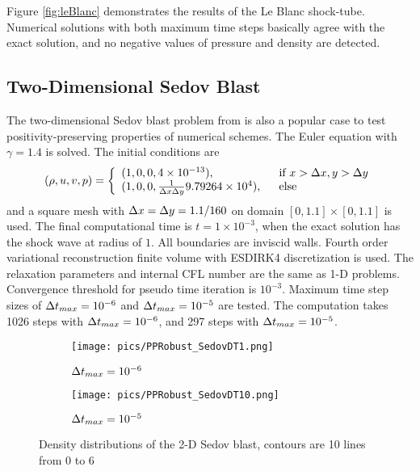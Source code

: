 Figure \ref{fig:leBlanc} demonstrates 
the results of the Le Blanc shock-tube.
Numerical solutions with both maximum time steps 
basically agree with the exact solution, 
and no negative values of pressure and density are detected. 


\subsection{Two-Dimensional Sedov Blast}

The two-dimensional Sedov blast problem from \cite{zhang2010positivity}
is also a popular
case to test positivity-preserving properties of 
numerical schemes. 
The Euler equation with $\gamma = 1.4$ is solved.
The initial conditions 
are 
\begin{equation}
    (\rho,u,v,p) = \left\{
        \begin{array}{ll}
            (1,0,0,4\times 10 ^{-13}),\ \ & \text{if } x > \mathrm\Delta x, y > \mathrm\Delta y \\
            (1,0,0,\frac{1}{\mathrm\Delta x\mathrm\Delta y}9.79264\times10^{4}),\ \ & \text{else}\\
        \end{array}
    \right.
\end{equation}
and a square mesh with $\mathrm\Delta x = \mathrm\Delta y = 1.1/160$ on domain $[0,1.1]\times[0,1.1]$
is used. The final computational time is $t = 1\times10^{-3}$,
when the exact solution has the shock wave at radius of $1$. 
All boundaries are inviscid walls.
Fourth order variational reconstruction finite volume with ESDIRK4
 discretization is used. 
The relaxation parameters and internal CFL number are the same as 1-D problems.
Convergence threshold for pseudo time iteration is $10^{-3}$. 
Maximum time step sizes of $\mathrm\Delta t_{max}=10^{-6}$ and $\mathrm\Delta t_{max}=10^{-5}$
are tested. 
The computation takes 1026 steps with $\mathrm\Delta t_{max}=10^{-6}$, 
and 297 steps with $\mathrm\Delta t_{max}=10^{-5}$.


\begin{figure}[htbp]
    \centering
    \begin{subfigure}{0.5\textwidth}
        \texttt{[image: pics/PPRobust\_SedovDT1.png]}
        \caption[]{$\mathrm\Delta t_{max}=10^{-6}$}
    \end{subfigure}\hfill
    \begin{subfigure}{0.5\textwidth}
        \texttt{[image: pics/PPRobust\_SedovDT10.png]}
        \caption[]{$\mathrm\Delta t_{max}=10^{-5}$}
    \end{subfigure}
    \caption{Density distributions of the 2-D Sedov blast, contours are 10 lines from 0 to 6}
    \label{fig:sedov}
\end{figure}

